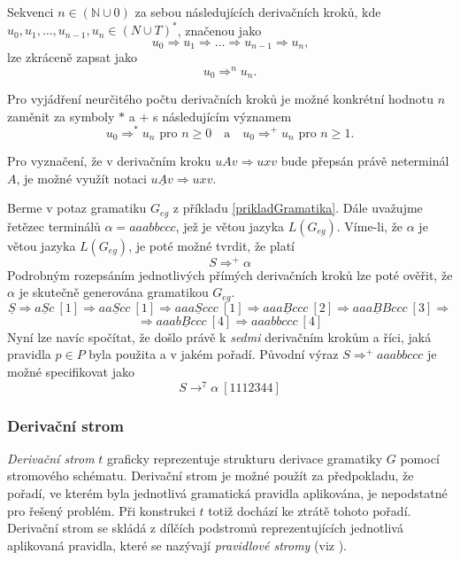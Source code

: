 Sekvenci $n \in (\mathbb{N} \cup 0)$ za sebou následujících derivačních kroků,
kde \linebreak $u_0, u_1, \dots, u_{n-1}, u_n \in (N \cup T)^*$, značenou jako
$$u_0 \Rightarrow u_1 \Rightarrow \dots \Rightarrow u_{n-1} \Rightarrow u_n\text{,}$$
lze zkráceně zapsat jako
$$u_0 \Rightarrow^n u_n\text{.}$$

Pro vyjádření neurčitého počtu derivačních kroků je možné konkrétní hodnotu $n$ zaměnit za symboly $*$ a $+$
s následujícím významem
\begin{displaymath}
  u_0 \Rightarrow^* u_n \text{\ pro\ } n \geq 0
  \quad \text{a} \quad
  u_0 \Rightarrow^+ u_n \text{\ pro\ } n \geq 1.
\end{displaymath}

\begin{konvence}
  Pro vyznačení, že v derivačním kroku $u A v \Rightarrow u x v$ bude přepsán právě neterminál $A$, je možné využít notaci
  $u \underline{A} v \Rightarrow u x v$.
\end{konvence}

\begin{priklad} \label{prikladDeriv}
  Berme v potaz gramatiku $G_{eg}$ z příkladu \ref{prikladGramatika}. Dále uvažujme řetězec terminálů $\alpha = aaabbccc$, jež
  je větou jazyka $L(G_{eg})$. Víme-li, že $\alpha$ je větou jazyka $L(G_{eg})$, je poté možné tvrdit, že platí
  $$S \Rightarrow^+ \alpha$$
  Podrobným rozepsáním jednotlivých přímých derivačních kroků lze poté ověřit, že $\alpha$ je skutečně generována gramatikou $G_{eg}$.
  $$\underline{S} \Rightarrow a\underline{S}c\ [1] \Rightarrow aa\underline{S}cc\ [1] \Rightarrow aaa\underline{S}ccc\ [1] \Rightarrow aaa\underline{B}ccc\ [2] \Rightarrow aaa\underline{B}Bccc\ [3] \Rightarrow$$
  $$\Rightarrow aaab\underline{B}ccc\ [4] \Rightarrow aaabbccc\ [4]$$
  Nyní lze navíc spočítat, že došlo právě k \emph{sedmi} derivačním krokům a říci, jaká pravidla $p \in P$ byla použita a v jakém pořadí.
  Původní výraz $S \Rightarrow^+ aaabbccc$ je možné specifikovat jako
  $$S \rightarrow^7 \alpha\ [1112344]$$
\end{priklad}

\subsubsection{Derivační strom}
\emph{Derivační strom} $t$ graficky reprezentuje strukturu derivace gramatiky $G$ pomocí stromového schématu. Derivační strom je možné použít
za předpokladu, že pořadí, ve kterém byla jednotlivá gramatická pravidla aplikována, je nepodstatné pro řešený problém.
Při konstrukci $t$ totiž dochází ke ztrátě tohoto pořadí. Derivační strom se skládá z dílčích
podstromů reprezentujících jednotlivá aplikovaná pravidla, které se nazývají \emph{pravidlové stromy} (viz \cite{Meduna:2000:AutomataAndLanguages}).

